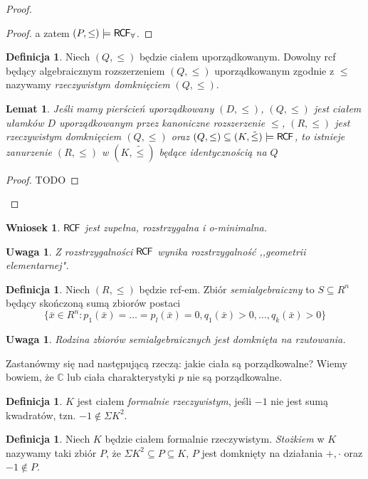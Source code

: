 \documentclass{article}
\newcommand{\C}{\mathbb{C}}
\theoremstyle{plain}
\newtheorem{wn}[thm]{Wniosek}
\newtheorem{lem}[thm]{Lemat}
\newtheorem{uw}[thm]{Uwaga}
\theoremstyle{definition}
\newtheorem{df}[thm]{Definicja}
\theoremstyle{remark}
\newcommand{\RCF}{\mathsf{R \mkern-1.7mu C \mkern-1.4mu F}}
\begin{document}
\begin{proof}
\begin{proof}
		 a zatem $(P, \leq) \models \RCF_{\forall}$.
	\end{proof}
	\begin{df}
		 Niech $(Q, \leq)$ będzie ciałem uporządkowanym.
		 Dowolny rcf będący algebraicznym rozszerzeniem $(Q, \leq)$ uporządkowanym zgodnie z $ \leq$ nazywamy
		 \textit{rzeczywistym domknięciem} $ (Q, \leq)$.
	\end{df}
	\begin{lem}
		 Jeśli mamy pierścień uporządkowany $ (D, \leq)$,
		 $(Q, \leq)$ jest ciałem ułamków $D$ uporządkowanym przez kanoniczne rozszerzenie $\leq$,
		 $ (R, \leq)$ jest rzeczywistym domknięciem $ (Q, \leq)$
		 oraz $ (Q, \leq) \subseteq (K, \tilde{\leq}) \models \RCF$,
		 to istnieje zanurzenie $ (R, \leq)$ w $ (K, \tilde{\leq})$ będące identycznością na $ Q$
	\end{lem}
	\begin{proof}
		 TODO
	\end{proof}




\end{proof}

\begin{wn}
	$ \RCF$ jest zupełna, rozstrzygalna i \textit{o}-minimalna.
\end{wn}

\begin{uw}
	 Z rozstrzygalności $ \RCF$ wynika rozstrzygalność ,,geometrii elementarnej".
\end{uw}

\begin{df}
	 Niech $ (R, \leq)$ będzie rcf-em.
	 Zbiór \textit{semialgebraiczny} to $ S \subseteq R^n$ będący skończoną sumą zbiorów postaci
	 \[
		 \{\bar{x} \in R^n \colon p_1(\bar{x}) = \ldots = p_l(\bar{x}) = 0, q_1(\bar{x}) > 0, \ldots, q_k(\bar{x}) > 0 \}
	 \]
\end{df}

\begin{uw}
	 Rodzina zbiorów semialgebraicznych jest domknięta na rzutowania.
\end{uw}


Zastanówmy się nad następującą rzeczą: jakie ciała są porządkowalne?
Wiemy bowiem, że $ \C$ lub ciała charakterystyki $ p$ nie są porządkowalne.

\begin{df}
	 $ K$ jest ciałem \textit{formalnie rzeczywistym}, jeśli $ -1$ nie jest sumą kwadratów, tzn. $ -1 \not \in \Sigma K^2$.
\end{df}
\begin{df}
         Niech $ K$ będzie ciałem formalnie rzeczywistym.
         \textit{Stożkiem} w $ K$ nazywamy taki zbiór $P$,
	 że $\Sigma K^2 \subseteq P \subseteq K$, $P$ jest domknięty na działania $+, \cdot$ oraz $-1 \not \in P$.
\end{df}
\end{document}
